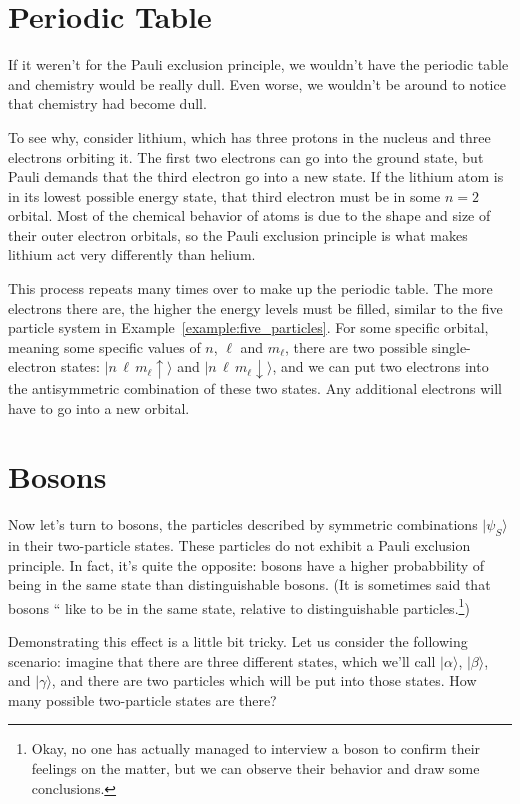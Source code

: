 \section{Periodic Table}

If it weren't for the Pauli exclusion principle, we wouldn't have the
periodic table and chemistry would be really dull.  Even worse, we
wouldn't be around to notice that chemistry had become dull.

To see why, consider lithium, which has three protons in the nucleus
and three electrons orbiting it.  The first two electrons can go into
the ground state, but Pauli demands that the third electron go into a
new state.  If the lithium atom is in its lowest possible energy
state, that third electron must be in some $n=2$ orbital.  Most of the
chemical behavior of atoms is due to the shape and size of their outer
electron orbitals, so the Pauli exclusion principle is what makes
lithium act very differently than helium.

This process repeats many times over to make up the periodic table.
The more electrons there are, the higher the energy levels must be filled,
similar to the five particle system in Example~\ref{example:five_particles}.
For some specific orbital, meaning some specific values of $n$, $\ell$
and $m_\ell$, there are two possible single-electron states:
$|n\,\ell\,m_\ell\uparrow\rangle$ and
$|n\,\ell\,m_\ell\downarrow\rangle$, and we can put two electrons into
the antisymmetric combination of these two states.  Any additional
electrons will have to go into a new orbital.


\section{Bosons}

Now let's turn to bosons, the particles described by symmetric
combinations $|\psi_S\rangle$ in their two-particle states.  These
particles do not exhibit a Pauli exclusion principle.  In fact, it's
quite the opposite: bosons have a higher probabbility of being in 
the same state than distinguishable bosons.  (It is sometimes 
said that bosons `` like to be in the same state, relative to
distinguishable particles.\footnote{Okay, no one has actually managed
  to interview a boson to confirm their feelings on the matter, but we
  can observe their behavior and draw some conclusions.})

Demonstrating this effect is a little bit tricky.  Let us consider the
following scenario: imagine that there are three different states,
which we'll call $|\alpha\rangle$, $|\beta\rangle$, and
$|\gamma\rangle$, and there are two particles which will be put into
those states.  How many possible two-particle states are there?

